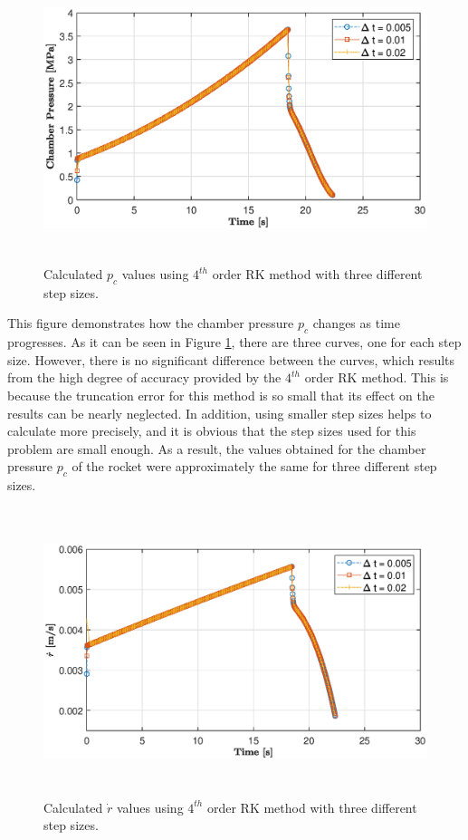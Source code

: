 \documentclass[letterpaper,12pt]{article}
\begin{document}
\begin{figure} [ht]
	\centering
	\includegraphics[height = 8.4cm]{graphs/q1_pc.eps}
	\caption{Calculated $p_c$ values using $4^{th}$ order RK method with three different step sizes.}
     \label{fig:q1pc}
\end{figure}

This figure demonstrates how the chamber pressure $p_c$ changes as time progresses. As it can be seen in 
Figure \ref{fig:q1pc}, there are three curves, one for each step size. However,
there is no significant difference between the curves, which results from the high degree of accuracy
provided by the $4^{th}$ order RK method. This is because the truncation error for this method is so
small that its effect on the results can be nearly neglected. In addition, using smaller step sizes
helps to calculate more precisely, and it is obvious that the step sizes used for this problem are small
enough. As a result, the values obtained for the chamber pressure $p_c$ of the rocket were approximately
the same for three different step sizes.

\newpage

\begin{figure} [!h]
	\centering
	\includegraphics[height = 8.4cm]{graphs/q1_rdot.eps}
	\caption{Calculated $\dot{r}$ values using $4^{th}$ order RK method with three different step sizes.}
	\label{fig:q1rdot}
\end{figure}
\end{document}
